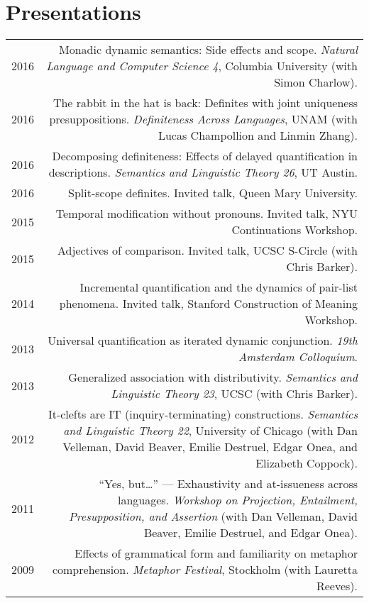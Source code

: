 \documentclass[12pt]{article}
\begin{document}
\section*{Presentations}

\begin{longtable}{LR}
  2016 &  Monadic dynamic semantics: Side effects and scope. \textit{Natural
          Language and Computer Science 4}, Columbia University (with Simon
          Charlow).\\
  2016 &  The rabbit in the hat is back: Definites with joint uniqueness
          presuppositions. \textit{Definiteness Across Languages}, UNAM (with
          Lucas Champollion and Linmin Zhang).\\
  2016 &  Decomposing definiteness: Effects of delayed quantification in
          descriptions. \textit{Semantics and Linguistic Theory 26}, UT Austin.\\
  2016 &  Split-scope definites. Invited talk, Queen Mary University.\\
  2015 &  Temporal modification without pronouns. Invited talk, NYU
          Continuations Workshop.\\
  2015 &  Adjectives of comparison. Invited talk, UCSC S-Circle (with Chris
          Barker).\\
  2014 &  Incremental quantification and the dynamics of pair-list phenomena.
          Invited talk, Stanford Construction of Meaning Workshop.\\
  2013 &  Universal quantification as iterated dynamic conjunction. \textit{19th
          Amsterdam Colloquium}. \\
  2013 &  Generalized association with distributivity. \textit{Semantics and
          Linguistic Theory 23}, UCSC (with Chris Barker).\\
  2012 &  It-clefts are IT (inquiry-terminating) constructions.
          \textit{Semantics and Linguistic Theory 22}, University of Chicago
          (with Dan Velleman, David Beaver, Emilie Destruel, Edgar Onea, and
          Elizabeth Coppock).\\
  2011 &  ``Yes, but\dots'' --- Exhaustivity and at-issueness across languages.
          \textit{Workshop on Projection, Entailment, Presupposition, and
          Assertion} (with Dan Velleman, David Beaver, Emilie Destruel, and
          Edgar Onea).\\
  2009 &  Effects of grammatical form and familiarity on metaphor
          comprehension. \textit{Metaphor Festival}, Stockholm (with Lauretta Reeves).
\end{longtable}
\end{document}
